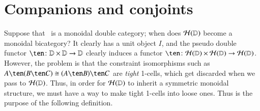 \section{Companions and conjoints}
\label{sec:comp-conj}

Suppose that \lD\ is a monoidal double category; when does
$\mathcal{H}(\mathbb{D})$ become a monoidal bicategory?  It clearly has a
unit object $I$, and the pseudo double functor $\ten\maps
\lD\times\lD\to\lD$ clearly induces a functor $\ten\maps
\cH(\lD)\times\cH(\lD)\to\cH(\lD)$.  However, the problem is that the
constraint isomorphisms such as $A\ten (B\ten C)\iso (A\ten B)\ten C$
are \emph{tight} 1-cells, which get discarded when we pass to
$\mathcal{H}(\mathbb{D})$.  Thus, in order for $\mathcal{H}(\mathbb{D})$ to inherit a symmetric
monoidal structure, we must have a way to make tight 1-cells
into loose ones.  Thus is the purpose of the following
definition.


